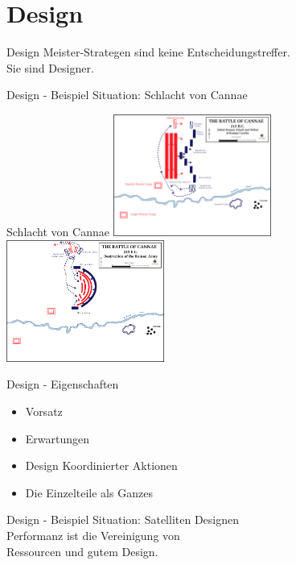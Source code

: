 \section{Design}


\begin{frame}[c]{Design}
    \large
    Meister-Strategen sind keine Entscheidungstreffer. \\
    \pause \LARGE
    Sie sind Designer.
\end{frame}


\begin{frame}[c]{Design - Beispiel}
    \Large
    Situation: Schlacht von Cannae
\end{frame}


\begin{frame}[c]{Schlacht von Cannae}
    \includegraphics[height=4cm]{Initial_Roman_attack}
    \pause
    \includegraphics[height=4cm]{Battle_cannae_destruction}
\end{frame}

\begin{frame}[c]{Design - Eigenschaften}
    \large
    \begin{itemize}
        \item Vorsatz
            \pause
        \item Erwartungen
            \pause
        \item Design Koordinierter Aktionen
            \pause
        \item Die Einzelteile als Ganzes
    \end{itemize}
\end{frame}


\begin{frame}[c]{Design - Beispiel}
    \Large
    Situation: Satelliten Designen \\
    \pause
    Performanz ist die Vereinigung von \\
    Ressourcen und gutem Design.
\end{frame}


